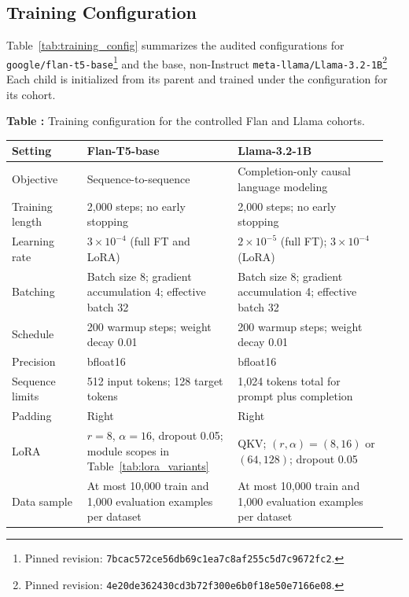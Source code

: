\documentclass{article}
\theoremstyle{definition}
\theoremstyle{plain}
\begin{document}
\subsection*{Training Configuration}
Table~\ref{tab:training_config} summarizes the audited configurations for
\texttt{google/flan-t5-base}\footnote{Pinned revision:
\nolinkurl{7bcac572ce56db69c1ea7c8af255c5d7c9672fc2}.} and the base, non-Instruct
\texttt{meta-llama/Llama-3.2-1B}\footnote{Pinned revision:
\nolinkurl{4e20de362430cd3b72f300e6b0f18e50e7166e08}.} Each child is initialized
from its parent and trained under the configuration for its cohort.

\begin{center}
\begin{minipage}{\linewidth}
\centering
{}
\label{tab:training_config}
\textbf{Table \thetable:} Training configuration for the controlled Flan and Llama cohorts.
\vspace{4pt}

\small
\setlength{\tabcolsep}{4pt}
\begin{tabular}{@{}p{0.19\linewidth}p{0.38\linewidth}p{0.38\linewidth}@{}}
\toprule
Setting & Flan-T5-base & Llama-3.2-1B \\
\midrule
Objective & Sequence-to-sequence & Completion-only causal language modeling \\
Training length & 2,000 steps; no early stopping & 2,000 steps; no early stopping \\
Learning rate & $3\times10^{-4}$ (full FT and LoRA) & $2\times10^{-5}$ (full FT); $3\times10^{-4}$ (LoRA) \\
Batching & Batch size 8; gradient accumulation 4; effective batch 32 & Batch size 8; gradient accumulation 4; effective batch 32 \\
Schedule & 200 warmup steps; weight decay 0.01 & 200 warmup steps; weight decay 0.01 \\
Precision & bfloat16 & bfloat16 \\
Sequence limits & 512 input tokens; 128 target tokens & 1,024 tokens total for prompt plus completion \\
Padding & Right & Right \\
LoRA & $r=8$, $\alpha=16$, dropout 0.05; module scopes in Table~\ref{tab:lora_variants} & QKV; $(r,\alpha)=(8,16)$ or $(64,128)$; dropout 0.05 \\
Data sample & At most 10,000 train and 1,000 evaluation examples per dataset & At most 10,000 train and 1,000 evaluation examples per dataset \\
\bottomrule
\end{tabular}
\end{minipage}
\end{center}
\end{document}
